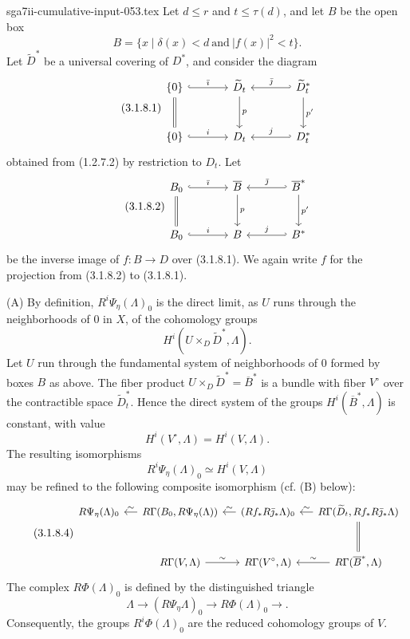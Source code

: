 \begin{filecontents*}{sga7ii-cumulative-input-053.tex}
Let $d\leq r$ and $t\leq\tau(d)$, and let $B$ be the open box
\[
B=\{x\mid\delta(x)<d\ \text{and}\ |f(x)|^2<t\}.
\]
Let $\widetilde D^*$ be a universal covering of $D^*$, and consider
the diagram
\begin{equation}\tag{3.1.8.1}
\begin{tikzcd}[column sep=large,row sep=large]
\{0\} \arrow[r,hook,"\bar\imath"] \arrow[d,equal]
  & \widetilde D_t \arrow[d,"p"]
  & \widetilde D_t^* \arrow[l,hook',"\bar\jmath"'] \arrow[d,"p'"] \\
\{0\} \arrow[r,hook,"i"]
  & D_t
  & D_t^* \arrow[l,hook',"j"']
\end{tikzcd}
\end{equation}
obtained from (1.2.7.2) by restriction to $D_t$.  Let
\begin{equation}\tag{3.1.8.2}
\begin{tikzcd}[column sep=large,row sep=large]
B_0 \arrow[r,hook,"\bar\imath"] \arrow[d,equal]
  & \overline B \arrow[d,"p"]
  & \overline B^* \arrow[l,hook',"\bar\jmath"'] \arrow[d,"p'"] \\
B_0 \arrow[r,hook,"i"]
  & B
  & B^* \arrow[l,hook',"j"']
\end{tikzcd}
\end{equation}
be the inverse image of $f:B\to D$ over (3.1.8.1).  We again write
$f$ for the projection from (3.1.8.2) to (3.1.8.1).

\medskip
\noindent\textup{(A)}
By definition, $R^i\Psi_\eta(\Lambda)_0$ is the direct limit, as $U$
runs through the neighborhoods of $0$ in $X$, of the cohomology groups
\[
H^i(U\times_D\widetilde D^*,\Lambda).
\]
Let $U$ run through the fundamental system of neighborhoods of $0$
formed by boxes $B$ as above.  The fiber product
$U\times_D\widetilde D^*=\overline B^*$ is a bundle with fiber
$V^\circ$ over the contractible space $\widetilde D_t^*$.  Hence the
direct system of the groups $H^i(\overline B^*,\Lambda)$ is constant,
with value
\[
H^i(V^\circ,\Lambda)=H^i(V,\Lambda).
\]
The resulting isomorphisms
\begin{equation}\tag{3.1.8.3}
R^i\Psi_\eta(\Lambda)_0\simeq H^i(V,\Lambda)
\end{equation}
may be refined to the following composite isomorphism (cf. (B)
below):
\begin{equation}\tag{3.1.8.4}
\begin{tikzcd}[column sep=small,row sep=large,cells={nodes={font=\small}}]
R\Psi_\eta(\Lambda)_0
  & R\Gamma(B_0,R\Psi_\eta(\Lambda)) \arrow[l,"\sim"']
  & (Rf_*R\bar\jmath_*\Lambda)_0 \arrow[l,"\sim"']
  & R\Gamma(\widetilde D_t,Rf_*R\bar\jmath_*\Lambda)
      \arrow[l,"\sim"'] \arrow[d,equal] \\
{}
  & R\Gamma(V,\Lambda) \arrow[r,"\sim"]
  & R\Gamma(V^\circ,\Lambda)
  & R\Gamma(\overline B^*,\Lambda) \arrow[l,"\sim"']
\end{tikzcd}
\end{equation}
The complex $R\Phi(\Lambda)_0$ is defined by the distinguished
triangle
\[
\Lambda\longrightarrow(R\Psi_\eta\Lambda)_0
\longrightarrow R\Phi(\Lambda)_0\longrightarrow{}.
\]
Consequently, the groups $R^i\Phi(\Lambda)_0$ are the reduced
cohomology groups of $V$.


\end{filecontents*}
